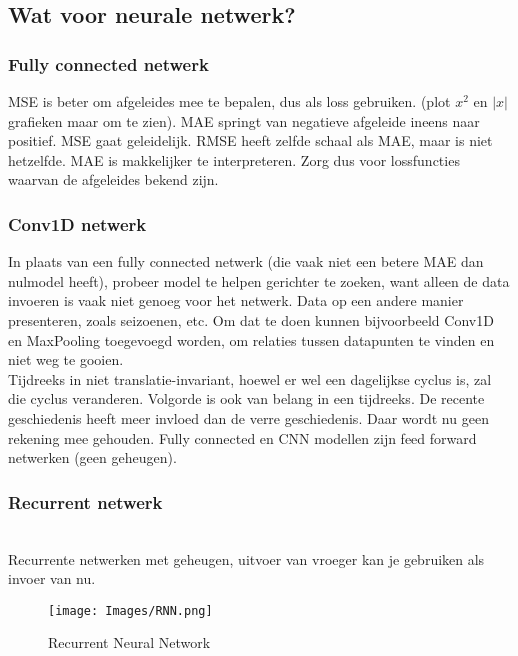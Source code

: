 {\subsection{Wat voor neurale netwerk?}

\subsubsection{Fully connected netwerk}
MSE is beter om afgeleides mee te bepalen, dus als loss gebruiken. (plot $x^2$ en $|x|$ grafieken maar om te zien). MAE springt van negatieve afgeleide ineens naar positief. MSE gaat geleidelijk. RMSE heeft zelfde schaal als MAE, maar is niet hetzelfde. MAE is makkelijker te interpreteren. Zorg dus voor lossfuncties waarvan de afgeleides bekend zijn.\\

\subsubsection{Conv1D netwerk}
In plaats van een fully connected netwerk (die vaak niet een betere MAE dan nulmodel heeft), probeer model te helpen gerichter te zoeken, want alleen de data invoeren is vaak niet genoeg voor het netwerk. Data op een andere manier presenteren, zoals seizoenen, etc. Om dat te doen kunnen bijvoorbeeld Conv1D en MaxPooling toegevoegd worden, om relaties tussen datapunten te vinden en niet weg te gooien.\\

\noindent Tijdreeks in niet translatie-invariant, hoewel er wel een dagelijkse cyclus is, zal die cyclus veranderen. Volgorde is ook van belang in een tijdreeks. De recente geschiedenis heeft meer invloed dan de verre geschiedenis. Daar wordt nu geen rekening mee gehouden. Fully connected en CNN modellen zijn feed forward netwerken (geen geheugen).\\

\subsubsection{Recurrent netwerk}\\
Recurrente netwerken met geheugen, uitvoer van vroeger kan je gebruiken als invoer van nu.
\begin{figure}[h]
    \centering
    \texttt{[image: Images/RNN.png]}
    \caption{Recurrent Neural Network}
    \label{fig:my_label}
\end{figure}

}
